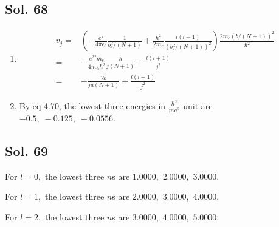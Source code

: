  \subsection*{Sol. 68}
 \begin{enumerate}
     \item 
     \begin{align*}
         v_j =& (-\frac{e^2}{4\pi\epsilon_0}\frac{1}{bj/(N+1)}
         +\frac{\hbar^2}{2m_e}\frac{l(l+1)}{(bj/(N+1))^2})\frac{2m_e(b/(N+1))^2}{\hbar^2}\\
         =&
          -\frac{e^22m_e}{4\pi\epsilon_0\hbar^2}
          \frac{b}{j(N+1)}
          +\frac{l(l+1)}{j^2}\\
          =&-\frac{2b}{ja(N+1)} + \frac{l(l+1)}{j^2}
     \end{align*}
     \item 
     By eq 4.70, the lowest three energies in $\frac{\hbar^2}{ma^2}$ unit are $-0.5,\; -0.125, \;-0.0556.$
 \end{enumerate}
 \subsection*{Sol. 69}
 For $l=0,$ the lowest three $n$s are 
 $1.0000,$ $2.0000,$ $3.0000$.
 
 For $l=1,$ the lowest three $n$s are 
 $2.0000,$ $3.0000,$ $4.0000$.

 For $l=2,$ the lowest three $n$s are 
 $3.0000,$ $4.0000,$ $5.0000$.

